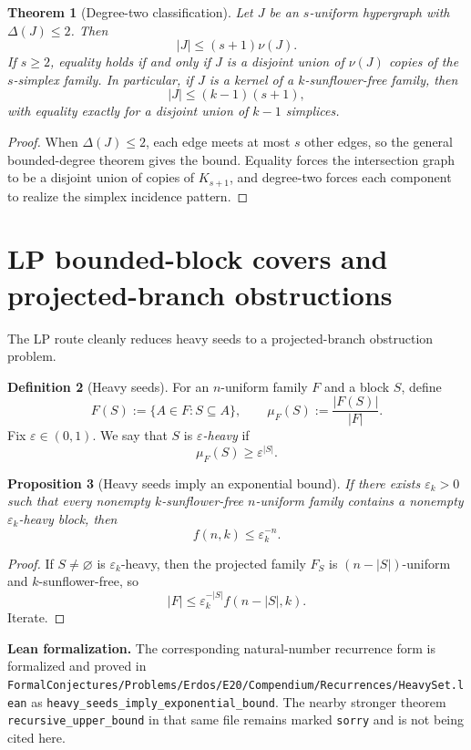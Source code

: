 \documentclass[11pt]{article}
\newtheorem{theorem}{Theorem}[section]
\newtheorem{proposition}[theorem]{Proposition}
\theoremstyle{definition}
\newtheorem{definition}[theorem]{Definition}
\newcommand{\eps}{\varepsilon}
\newcommand{\1}{\mathbf{1}}
\newcommand{\leannote}[1]{\par\smallskip\noindent\textbf{Lean formalization.} #1\par\smallskip}
\begin{document}
\begin{theorem}[Degree-two classification]\label{thm:degree-two}
Let $J$ be an $s$-uniform hypergraph with $\Delta(J)\le 2$. Then
\[
|J|\le (s+1)\nu(J).
\]
If $s\ge 2$, equality holds if and only if $J$ is a disjoint union of $\nu(J)$ copies of the $s$-simplex family.
In particular, if $J$ is a kernel of a $k$-sunflower-free family, then
\[
|J|\le (k-1)(s+1),
\]
with equality exactly for a disjoint union of $k-1$ simplices.
\end{theorem}

\begin{proof}
When $\Delta(J)\le 2$, each edge meets at most $s$ other edges, so the general bounded-degree theorem gives the bound.
Equality forces the intersection graph to be a disjoint union of copies of $K_{s+1}$, and degree-two forces each component to realize the simplex incidence pattern.
\end{proof}

\section{LP bounded-block covers and projected-branch obstructions}\label{sec:lp}
The LP route cleanly reduces heavy seeds to a projected-branch obstruction problem.

\begin{definition}[Heavy seeds]
For an $n$-uniform family $F$ and a block $S$, define
\[
F(S):=\{A\in F:S\subseteq A\},
\qquad
\mu_F(S):=\frac{|F(S)|}{|F|}.
\]
Fix $\eps\in(0,1)$. We say that $S$ is \emph{$\eps$-heavy} if
\[
\mu_F(S)\ge \eps^{|S|}.
\]
\end{definition}

\begin{proposition}[Heavy seeds imply an exponential bound]
If there exists $\eps_k>0$ such that every nonempty $k$-sunflower-free $n$-uniform family contains a nonempty $\eps_k$-heavy block, then
\[
f(n,k)\le \eps_k^{-n}.
\]
\end{proposition}

\begin{proof}
If $S\neq \varnothing$ is $\eps_k$-heavy, then the projected family $F_S$ is $(n-|S|)$-uniform and $k$-sunflower-free, so
\[
|F|\le \eps_k^{-|S|} f(n-|S|,k).
\]
Iterate.
\end{proof}

\leannote{The corresponding natural-number recurrence form is formalized and proved in \texttt{FormalConjectures/Problems/Erdos/E20/Compendium/Recurrences/HeavySet.lean} as \texttt{heavy\_seeds\_imply\_exponential\_bound}. The nearby stronger theorem \texttt{recursive\_upper\_bound} in that same file remains marked \texttt{sorry} and is not being cited here.}
\end{document}
